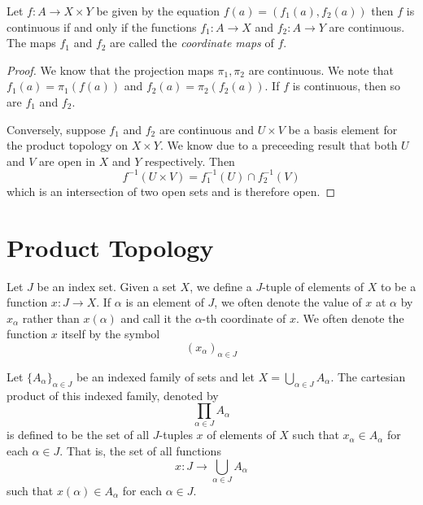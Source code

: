 \begin{theorem}
    Let $f:A\to X\times Y$ be given by the equation $f(a) = (f_1(a), f_2(a))$ then $f$ is continuous if and only if the functions $f_1:A\to X$ and $f_2:A\to Y$ are continuous. The maps $f_1$ and $f_2$ are called the \textit{coordinate maps} of $f$.
\end{theorem}
\begin{proof}
    We know that the projection maps $\pi_1, \pi_2$ are continuous. We note that $f_1(a) = \pi_1(f(a))$ and $f_2(a) = \pi_2(f_2(a))$. If $f$ is continuous, then so are $f_1$ and $f_2$.

    Conversely, suppose $f_1$ and $f_2$ are continuous and $U\times V$ be a basis element for the product topology on $X\times Y$. We know due to a preceeding result that both $U$ and $V$ are open in $X$ and $Y$ respectively. Then 
    \begin{equation*}
        f^{-1}(U\times V) = f_1^{-1}(U)\cap f_2^{-1}(V)
    \end{equation*}
    which is an intersection of two open sets and is therefore open.
\end{proof}

\section{Product Topology}
\begin{definition}
    Let $J$ be an index set. Given a set $X$, we define a $J$-tuple of elements of $X$ to be a function $x:J\to X$. If $\alpha$ is an element of $J$, we often denote the value of $x$ at $\alpha$ by $x_\alpha$ rather than $x(\alpha)$ and call it the $\alpha$-th coordinate of $x$. We often denote the function $x$ itself by the symbol
    \begin{equation*}
        (x_\alpha)_{\alpha\in J}
    \end{equation*}
\end{definition}

\begin{definition}
    Let $\{A_\alpha\}_{\alpha\in J}$ be an indexed family of sets and let $X = \bigcup_{\alpha\in J}A_\alpha$. The cartesian product of this indexed family, denoted by 
    \begin{equation*}
        \prod_{\alpha\in J}A_\alpha
    \end{equation*}
    is defined to be the set of all $J$-tuples $x$ of elements of $X$ such that $x_\alpha\in A_\alpha$ for each $\alpha\in J$. That is, the set of all functions 
    \begin{equation*}
        x: J\to\bigcup_{\alpha\in J}A_\alpha
    \end{equation*}
    such that $x(\alpha)\in A_\alpha$ for each $\alpha\in J$.
\end{definition}

